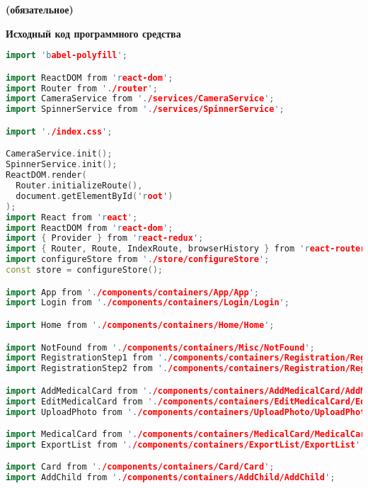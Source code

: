 \begin{center}
\vspace{-1em}
\textbf{ (обязательное)}

\textbf{Исходный код программного средства}
\end{center}


\begin{lstlisting}[language=C++, style=cplusplusstyle]
import 'babel-polyfill';

import ReactDOM from 'react-dom';
import Router from './router';
import CameraService from './services/CameraService';
import SpinnerService from './services/SpinnerService';

import './index.css';

CameraService.init();
SpinnerService.init();
ReactDOM.render(
  Router.initializeRoute(),
  document.getElementById('root')
);
import React from 'react';
import ReactDOM from 'react-dom';
import { Provider } from 'react-redux';
import { Router, Route, IndexRoute, browserHistory } from 'react-router';
import configureStore from './store/configureStore';
const store = configureStore();

import App from './components/containers/App/App';
import Login from './components/containers/Login/Login';

import Home from './components/containers/Home/Home';

import NotFound from './components/containers/Misc/NotFound';
import RegistrationStep1 from './components/containers/Registration/RegistrationStep1';
import RegistrationStep2 from './components/containers/Registration/RegistrationStep2';

import AddMedicalCard from './components/containers/AddMedicalCard/AddMedicalCard';
import EditMedicalCard from './components/containers/EditMedicalCard/EditMedicalCard';
import UploadPhoto from './components/containers/UploadPhoto/UploadPhoto';

import MedicalCard from './components/containers/MedicalCard/MedicalCard';
import ExportList from './components/containers/ExportList/ExportList';

import Card from './components/containers/Card/Card';
import AddChild from './components/containers/AddChild/AddChild';


\end{lstlisting}
